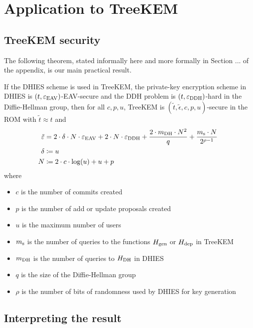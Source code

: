 \section{Application to TreeKEM} \label{sec:application-to-treekem}

\subsection{TreeKEM security} \label{sec:treekem-security}

The following theorem, stated informally here and more formally in Section ... of the appendix, is our main practical result.

\begin{theorem}[Informal]
	If the DHIES scheme is used in TreeKEM, the private-key encryption scheme in DHIES is $(t, \varepsilon_\mathrm{EAV})$-EAV-secure and the DDH problem is $(t, \varepsilon_\mathrm{DDH})$-hard in the Diffie-Hellman group, then for all $c, p, u$, TreeKEM is $(\tilde{t}, \tilde{\epsilon}, c, p, u)$-secure in the ROM with $\tilde{t} \approx t$ and
	\begin{align*}
		\tilde{\varepsilon} & = 2 \cdot \delta \cdot N \cdot \varepsilon_\mathrm{EAV} + 2 \cdot N \cdot \varepsilon_\mathrm{DDH} + \frac{2 \cdot m_\mathrm{DH} \cdot N^2}{q} + \frac{m_\mathrm{s} \cdot N}{2^{\rho - 1}} \\
		\delta           & \coloneqq u                                                                                                                        \\
		N                & \coloneqq 2 \cdot c \cdot \log(u) + u + p
	\end{align*}
	where
	\begin{itemize}
		\item $c$ is the number of commits created
		\item $p$ is the number of add or update proposals created
		\item $u$ is the maximum number of users
		\item $m_\mathrm{s}$ is the number of queries to the functions $H_\mathrm{gen}$ or $H_\mathrm{dep}$ in TreeKEM
		\item $m_\mathrm{DH}$ is the number of queries to $H_\mathrm{DH}$ in DHIES
		\item $q$ is the size of the Diffie-Hellman group
		\item $\rho$ is the number of bits of randomness used by DHIES for key generation
	\end{itemize}
\end{theorem}

\subsection{Interpreting the result}

